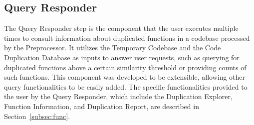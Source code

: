 \subsection{Query Responder}

The Query Responder step is the component that the user executes multiple times to consult information 
about duplicated functions in a codebase processed by the Preprocessor. 
It utilizes the Temporary Codebase and the Code Duplication Database as inputs to answer user requests, 
such as querying for duplicated functions above a certain similarity threshold or providing counts of such functions.
This component was developed to be extensible, allowing other query functionalities to be easily added. 
The specific functionalities provided to the user by the Query Responder, which include the 
Duplication Explorer, Function Information, and Duplication Report, are described in Section~\ref{subsec:func}.

